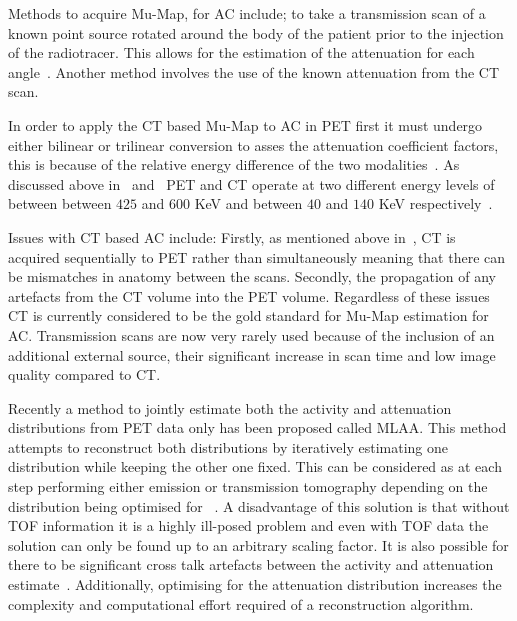                 Methods to acquire \gls{Mu-Map}, for \gls{AC} include; to take a transmission scan of a known point source rotated around the body of the patient prior to the injection of the radiotracer. This allows for the estimation of the attenuation for each angle~\parencite{TransmissionatnBib}. Another method involves the use of the known attenuation from the \gls{CT} scan.
                
                In order to apply the \gls{CT} based \gls{Mu-Map} to \gls{AC} in \gls{PET} first it must undergo either bilinear or trilinear conversion to asses the attenuation coefficient factors, this is because of the relative energy difference of the two modalities~\parencite{Carney2006}. As discussed above in~ and~ \gls{PET} and \gls{CT} operate at two different energy levels of between between $425$ and $600$ \gls{KeV} and between $40$ and $140$ \gls{KeV} respectively~\parencite{Bettinardi2011, CTattenuationenergyBib}.
                
                Issues with \gls{CT} based \gls{AC} include: Firstly, as mentioned above in~, \gls{CT} is acquired sequentially to \gls{PET} rather than simultaneously meaning that there can be mismatches in anatomy between the scans. Secondly, the propagation of any artefacts from the \gls{CT} volume into the \gls{PET} volume. Regardless of these issues \gls{CT} is currently considered to be the gold standard for \gls{Mu-Map} estimation for \gls{AC}. Transmission scans are now very rarely used because of the inclusion of an additional external source, their significant increase in scan time and low image quality compared to \gls{CT}. 
                
                Recently a method to jointly estimate both the activity and attenuation distributions from \gls{PET} data only has been proposed called \gls{MLAA}. This method attempts to reconstruct both distributions by iteratively estimating one distribution while keeping the other one fixed. This can be considered as at each step performing either emission or transmission tomography depending on the distribution being optimised for%
                ~\parencite{Fuin2017, Brusaferri2020JointPET}. A disadvantage of this solution is that without \gls{TOF} information it is a highly ill-posed problem and even with \gls{TOF} data the solution can only be found up to an arbitrary scaling factor. It is also possible for there to be significant cross talk artefacts between the activity and attenuation estimate~\parencite{MLAASalomonBib, MLAADefriseBib}. Additionally, optimising for the attenuation distribution increases the complexity and computational effort required of a reconstruction algorithm.
                

